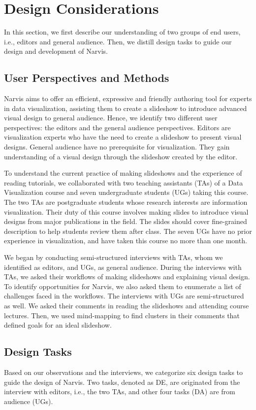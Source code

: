 \section{Design Considerations}
In this section, we first describe our understanding of two groups of end users, i.e., editors and general audience. Then, we distill design tasks to guide our design and development of Narvis.

\subsection{User Perspectives and Methods}

Narvis aims to offer an efficient, expressive and friendly authoring tool for experts in data visualization, assisting them to create a slideshow to introduce advanced visual design to general audience.  
Hence, we identify two different user perspectives: the editors and the general audience perspectives. Editors are visualization experts who have the need to create a slideshow to present visual designs. General audience have no prerequisite for visualization. They gain understanding of a visual design through the slideshow created by the editor. 

To understand the current practice of making slideshows and the experience of reading tutorials, we collaborated with two teaching assistants (TAs) of a Data Visualization course and seven undergraduate students (UGs) taking this course. The two TAs are postgraduate students whose research interests are information visualization. Their duty of this course involves making slides to introduce visual designs from major publications in the field. The slides should cover fine-grained description to help students review them after class. The seven UGs have no prior experience in visualization, and have taken this course no more than one month.  

We began by conducting semi-structured interviews with TAs, whom we identified as editors, and UGs, as general audience. During the interviews with TAs, we asked their workflows of making slideshows and explaining visual design. To identify opportunities for Narvis, we also asked them to enumerate a list of challenges faced in the workflows. The interviews with UGs are semi-structured as well. We asked their comments in reading the slideshows and attending course lectures. Then, we used mind-mapping to find clusters in their comments that defined goals for an ideal slideshow. 


\subsection{Design Tasks}
Based on our observations and the interviews, we categorize six design tasks to guide the design of Narvis. Two tasks, denoted as DE, are originated from the interview with editors, i.e., the two TAs, and other four tasks (DA) are from audience (UGs).


